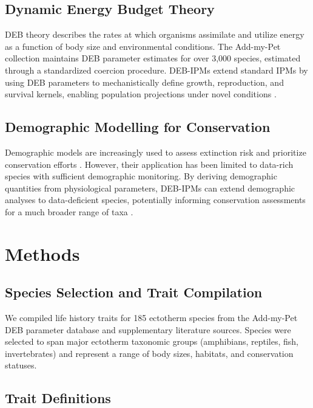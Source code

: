\documentclass[11pt]{article}
\begin{document}
\subsection{Dynamic Energy Budget Theory}

DEB theory \citep{kooijman2010} describes the rates at which organisms assimilate and utilize energy as a function of body size and environmental conditions. The Add-my-Pet collection \citep{marques2018} maintains DEB parameter estimates for over 3,000 species, estimated through a standardized coercion procedure. DEB-IPMs extend standard IPMs \citep{easterling2000} by using DEB parameters to mechanistically define growth, reproduction, and survival kernels, enabling population projections under novel conditions \citep{smallegange2017}.

\subsection{Demographic Modelling for Conservation}

Demographic models are increasingly used to assess extinction risk and prioritize conservation efforts \citep{salguero2016}. However, their application has been limited to data-rich species with sufficient demographic monitoring. By deriving demographic quantities from physiological parameters, DEB-IPMs can extend demographic analyses to data-deficient species, potentially informing conservation assessments for a much broader range of taxa \citep{nisbet2000}.

\section{Methods}

\subsection{Species Selection and Trait Compilation}

We compiled life history traits for 185 ectotherm species from the Add-my-Pet DEB parameter database and supplementary literature sources. Species were selected to span major ectotherm taxonomic groups (amphibians, reptiles, fish, invertebrates) and represent a range of body sizes, habitats, and conservation statuses.

\subsection{Trait Definitions}
\end{document}

